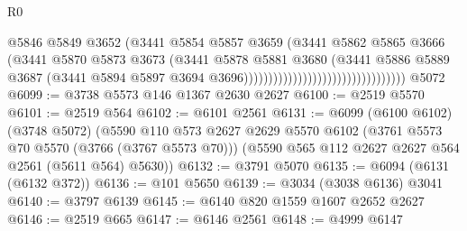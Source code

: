 \begin{lexlean}{R0}
\begin{coremodule}
                                                          @5846
                                                          @5849
                                                          @3652
                                                          (@3441
                                                            @5854
                                                            @5857
                                                            @3659
                                                            (@3441
                                                              @5862
                                                              @5865
                                                              @3666
                                                              (@3441
                                                                @5870
                                                                @5873
                                                                @3673
                                                                (@3441
                                                                  @5878
                                                                  @5881
                                                                  @3680
                                                                  (@3441
                                                                    @5886
                                                                    @5889
                                                                    @3687
                                                                    (@3441
                                                                      @5894
                                                                      @5897
                                                                      @3694
                                                                      @3696)))))))))))))))))))))))))))))))))
    @5072
@6099 := @3738 @5573 @146 @1367 @2630 @2627
@6100 := @2519 @5570
@6101 := @2519 @564
@6102 := @6101 @2561
@6131 := @6099
    (@6100 @6102)
    (@3748 @5072)
    (@5590
      @110
      @573
      @2627
      @2629
      @5570
      @6102
      (@3761 @5573 @70 @5570 (@3766 (@3767 @5573 @70)))
      (@5590 @565 @112 @2627 @2627 @564 @2561 (@5611 @564) @5630))
@6132 := @3791 @5070
@6135 := @6094 (@6131 (@6132 @372))
@6136 := @101 @5650
@6139 := @3034 (@3038 @6136) @3041
@6140 := @3797 @6139
@6145 := @6140 @820 @1559 @1607 @2652 @2627
@6146 := @2519 @665
@6147 := @6146 @2561
@6148 := @4999 @6147

\end{coremodule}
\end{lexlean}
